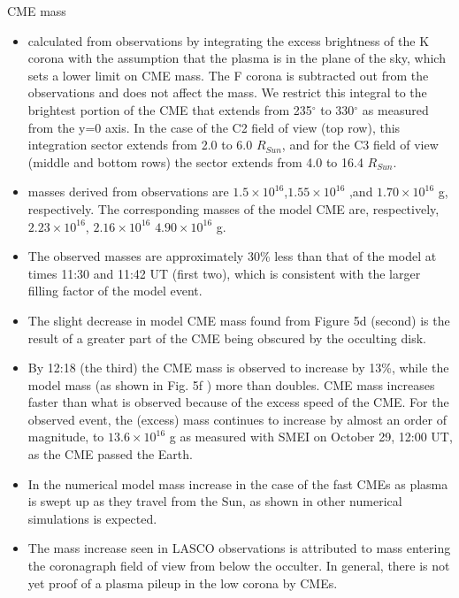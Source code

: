 \documentclass{beamer}
\begin{document}
\begin{frame}[allowframebreaks]{CME mass}

{\fontsize{10}{12}\selectfont
\begin{itemize}
\item calculated from observations by integrating the excess brightness of the K corona with
the assumption that the plasma is in the plane of the sky, which
sets a lower limit on CME mass. The F corona is subtracted out
from the observations and does not affect the mass. We restrict
this integral to the brightest portion of the CME that extends from
235$^\circ$ to 330$^\circ$ as measured from the  y=0 axis. In the case
of the C2 field of view (top row), this integration sector
extends from 2.0 to 6.0 $R_{Sun}$, and for the C3 field of view (middle and bottom rows) 
the sector extends from 4.0 to 16.4 $R_{Sun}$. 
\item masses derived from observations
 are $1.5\times10^{16}$,$1.55\times10^{16}$ ,and $1.70\times10^{16}$  g, respectively. 
The corresponding masses of the
model CME  are, respectively,  $2.23\times10^{16}$, $2.16\times10^{16}$ $4.90\times10^{16}$ g.
\item The observed masses are approximately 30\% less than that of
the model at times  11:30 and 11:42 UT (first two), which is consistent
with the larger filling factor of the model event. 
\item The slight decrease
in model CME mass found from Figure 5d (second) is the result of a greater
part of the CME being obscured by the occulting disk. 
\item By 12:18  (the third) the CME mass is observed to increase by 13\%, while the model
mass (as shown in Fig. 5f ) more than doubles.
CME mass increases faster than what is observed because of the
excess speed of the CME. For the observed event, the (excess)
mass continues to increase by almost an order of magnitude, to
$13.6\times10^{16}$  g as measured with SMEI on October 29, 12:00 UT,
as the CME passed the Earth.
\item In the numerical model mass increase in the case of the  
fast CMEs as plasma is swept up as they travel from
the Sun, as shown in other numerical simulations is expected.
\item The mass increase seen in
LASCO observations is attributed to mass entering the coronagraph
field of view from below the occulter. In
general, there is not yet proof of a plasma pileup in the low corona
by CMEs. 
\end{itemize}
}
\end{frame}

\end{document}
